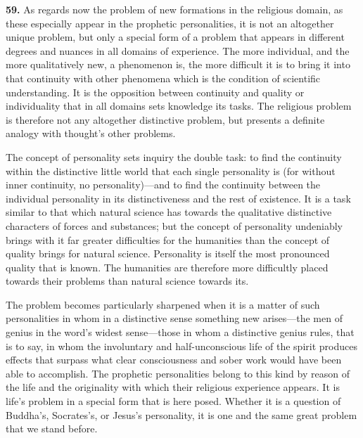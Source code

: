 \documentclass[12pt,a4paper]{book}
\newcommand{\opage}[1]{\marginnote{\footnotesize\textit{[#1]}}}
\begin{document}
\medskip

\noindent\textbf{59.} As regards now the problem of new formations in the religious domain, as these
especially appear in the prophetic personalities, it is not an altogether unique problem, but only a
special form of a problem that appears in different degrees and nuances in all domains of
experience. The more individual, and the more qualitatively new, a phenomenon is, the more difficult
it is to bring it into that continuity with other phenomena which is the condition of scientific
understanding. It is the opposition between continuity and quality or individuality that in all
domains sets knowledge its tasks. The religious problem is therefore not any altogether distinctive
problem, but presents a definite analogy with thought's other problems.

The concept of personality sets inquiry the double task: to find the continuity within the
distinctive little world that each single personality is (for without inner continuity, no
personality)---and to find the continuity between the 
\opage{131}individual personality in its distinctiveness
and the rest of existence. It is a task similar to that which natural science has towards the
qualitative distinctive characters of forces and substances; but the concept of personality
undeniably brings with it far greater difficulties for the humanities than the concept of quality
brings for natural science. Personality is itself the most pronounced quality that is known. The
humanities are therefore more difficultly placed towards their problems than natural science towards
its.

The problem becomes particularly sharpened when it is a matter of such personalities in whom in a
distinctive sense something new arises---the men of genius in the word's widest sense---those in whom
a distinctive genius rules, that is to say, in whom the involuntary and half-unconscious life of the
spirit produces effects that surpass what clear consciousness and sober work would have been able to
accomplish. The prophetic personalities belong to this kind by reason of the life and the originality
with which their religious experience appears. It is life's problem in a special form that is here
posed. Whether it is a question of Buddha's, Socrates's, or Jesus's personality, it is one and the
same great problem that we stand before.
\end{document}
